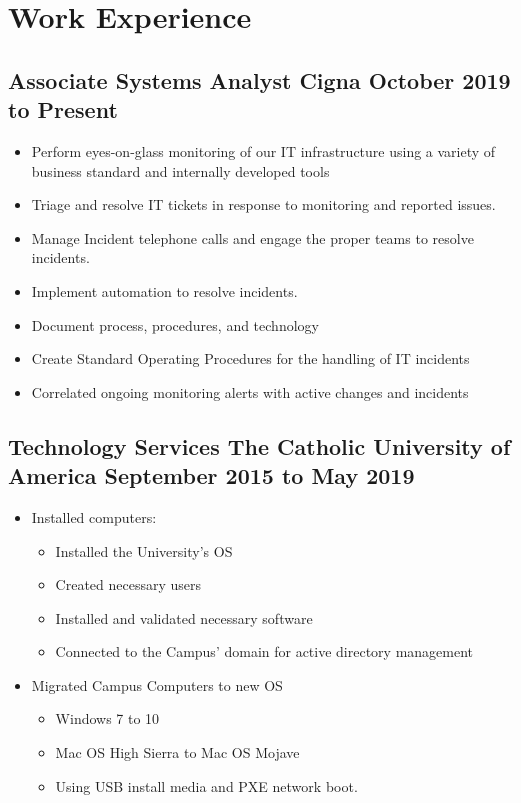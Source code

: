 \section{Work Experience}
\subsection{Associate Systems Analyst \hspace {20pt} Cigna \hfill October 2019 to Present}
\begin{itemize}
	\item Perform eyes-on-glass monitoring of our IT infrastructure using a variety of business standard and internally developed tools
	\item Triage and resolve IT tickets in response to monitoring and reported issues.
	\item Manage Incident telephone calls and engage the proper teams to resolve incidents.
	\item Implement automation to resolve incidents.
	\item Document process, procedures, and technology
	\item Create Standard Operating Procedures for the handling of IT incidents
	\item Correlated ongoing monitoring alerts with active changes and incidents
\end{itemize}
\subsection{Technology Services \hspace {20pt}The Catholic University of America \hfill September 2015 to May 2019}
\begin{itemize}
	\item Installed computers:
		\begin{itemize}
			\item Installed the University's OS
			\item Created necessary users
			\item Installed and validated necessary software
			\item Connected to the Campus' domain for active directory management
		\end{itemize}
	\item Migrated Campus Computers to new OS
		\begin{itemize}
			\item Windows 7 to 10
			\item Mac OS High Sierra to Mac OS Mojave
			\item Using USB install media and PXE network boot.
		\end{itemize}
\end{itemize}
